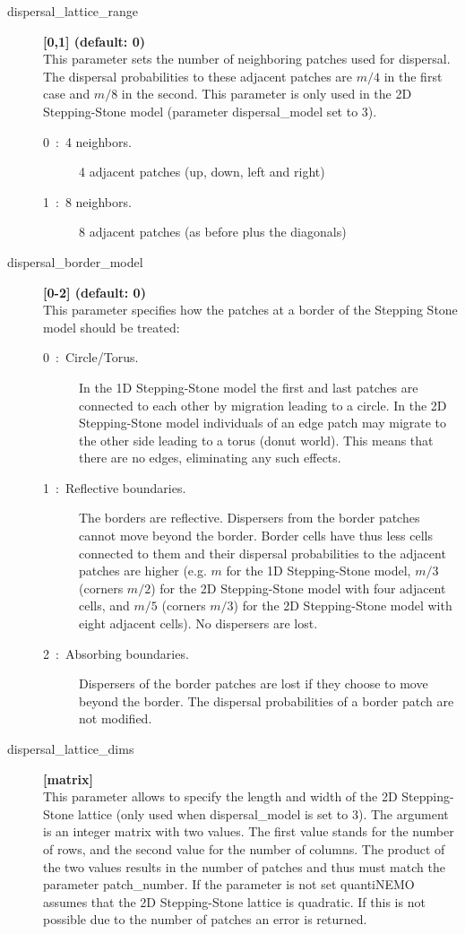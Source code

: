 \documentclass[letterpaper,12pt,oneside]{book}
\begin{document}
\begin{description}
\item[dispersal\_lattice\_range] \textbf{[0,1] (default: 0)}\\
This parameter sets the number of neighboring patches used for dispersal. The dispersal probabilities to these adjacent patches are $m/4$ in the first case and $m/8$ in the second. This parameter is only used in the 2D Stepping-Stone model (parameter \textsf{dispersal\_model} set to 3).
\begin{description}
\item[0~:~4 neighbors.]4 adjacent patches (up, down, left and right)
\item[1~:~8 neighbors.]8 adjacent patches (as before plus the diagonals)
\end{description}

\item[dispersal\_border\_model] \textbf{[0-2] (default: 0)}\\
This parameter specifies how the patches at a border of the Stepping Stone model should be treated:
\begin{description}
\item[0~:~Circle/Torus.] In the 1D Stepping-Stone model the first and last patches are connected to each other by migration leading to a circle. In the 2D Stepping-Stone model individuals of an edge patch may migrate to the other side leading to a torus (donut world). This means that there are no edges, eliminating any such effects.
\item[1~:~Reflective boundaries.] The borders are reflective. Dispersers from the border patches cannot move beyond the border. Border cells have thus less cells connected to them and their dispersal probabilities to the adjacent patches are higher (e.g. $m$ for the 1D Stepping-Stone model, $m/3$ (corners $m/2$) for the 2D Stepping-Stone model with four adjacent cells, and $m/5$ (corners $m/3$) for the 2D Stepping-Stone model with eight adjacent cells). No dispersers are lost.
\item[2~:~Absorbing boundaries.] Dispersers of the border patches are lost if they choose to move beyond the border. The dispersal probabilities of a border patch are not modified. 
\end{description}

\item[dispersal\_lattice\_dims] \textbf{[matrix]}\\
This parameter allows to specify the length and width of the 2D Stepping-Stone lattice (only used when \textsf{dispersal\_model} is set to 3). The argument is an integer matrix with two values. The first value stands for the number of rows, and the second value for the number of columns. The product of the two values results in the number of patches and thus must match the parameter \textsf{patch\_number}. If the parameter is not set quantiNEMO assumes that the 2D Stepping-Stone lattice is quadratic. If this is not possible due to the number of patches an error is returned. 



\end{description}
\end{document}
